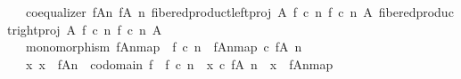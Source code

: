 \begin{isabellebody}
\ \ \ coequalizer\ {\isacharparenleft}{\kern0pt}f{\isasymlparr}A{\isasymrparr}\isactrlbsub n\isactrlesub {\isacharparenright}{\kern0pt}\ {\isacharparenleft}{\kern0pt}f{\isasymrestriction}\isactrlbsub {\isacharparenleft}{\kern0pt}A{\isacharcomma}{\kern0pt}\ n{\isacharparenright}{\kern0pt}\isactrlesub {\isacharparenright}{\kern0pt}\ {\isacharparenleft}{\kern0pt}fibered{\isacharunderscore}{\kern0pt}product{\isacharunderscore}{\kern0pt}left{\isacharunderscore}{\kern0pt}proj\ A\ {\isacharparenleft}{\kern0pt}f\ {\isasymcirc}\isactrlsub c\ n{\isacharparenright}{\kern0pt}\ {\isacharparenleft}{\kern0pt}f\ {\isasymcirc}\isactrlsub c\ n{\isacharparenright}{\kern0pt}\ A{\isacharparenright}{\kern0pt}\ {\isacharparenleft}{\kern0pt}fibered{\isacharunderscore}{\kern0pt}product{\isacharunderscore}{\kern0pt}right{\isacharunderscore}{\kern0pt}proj\ A\ {\isacharparenleft}{\kern0pt}f\ {\isasymcirc}\isactrlsub c\ n{\isacharparenright}{\kern0pt}\ {\isacharparenleft}{\kern0pt}f\ {\isasymcirc}\isactrlsub c\ n{\isacharparenright}{\kern0pt}\ A{\isacharparenright}{\kern0pt}\ {\isasymand}\isanewline
\ \ \ monomorphism\ {\isacharparenleft}{\kern0pt}{\isacharbrackleft}{\kern0pt}f{\isasymlparr}A{\isasymrparr}\isactrlbsub n\isactrlesub {\isacharbrackright}{\kern0pt}map{\isacharparenright}{\kern0pt}\ {\isasymand}\ f\ {\isasymcirc}\isactrlsub c\ n\ {\isacharequal}{\kern0pt}\ {\isacharparenleft}{\kern0pt}{\isacharbrackleft}{\kern0pt}f{\isasymlparr}A{\isasymrparr}\isactrlbsub n\isactrlesub {\isacharbrackright}{\kern0pt}map{\isacharparenright}{\kern0pt}\ {\isasymcirc}\isactrlsub c\ {\isacharparenleft}{\kern0pt}f{\isasymrestriction}\isactrlbsub {\isacharparenleft}{\kern0pt}A{\isacharcomma}{\kern0pt}\ n{\isacharparenright}{\kern0pt}\isactrlesub {\isacharparenright}{\kern0pt}\ {\isasymand}\ \isanewline
\ \ \ {\isacharparenleft}{\kern0pt}{\isasymforall}x{\isachardot}{\kern0pt}\ x\ {\isacharcolon}{\kern0pt}\ {\isacharparenleft}{\kern0pt}f{\isasymlparr}A{\isasymrparr}\isactrlbsub n\isactrlesub {\isacharparenright}{\kern0pt}\ {\isasymrightarrow}\ codomain\ f\ {\isasymlongrightarrow}\ f\ {\isasymcirc}\isactrlsub c\ n\ {\isacharequal}{\kern0pt}\ x\ {\isasymcirc}\isactrlsub c\ {\isacharparenleft}{\kern0pt}f{\isasymrestriction}\isactrlbsub {\isacharparenleft}{\kern0pt}A{\isacharcomma}{\kern0pt}\ n{\isacharparenright}{\kern0pt}\isactrlesub {\isacharparenright}{\kern0pt}\ {\isasymlongrightarrow}\ x\ {\isacharequal}{\kern0pt}\ {\isacharparenleft}{\kern0pt}{\isacharbrackleft}{\kern0pt}f{\isasymlparr}A{\isasymrparr}\isactrlbsub n\isactrlesub {\isacharbrackright}{\kern0pt}map{\isacharparenright}{\kern0pt}{\isacharparenright}{\kern0pt}{\isachardoublequoteclose}\isanewline

\end{isabellebody}

